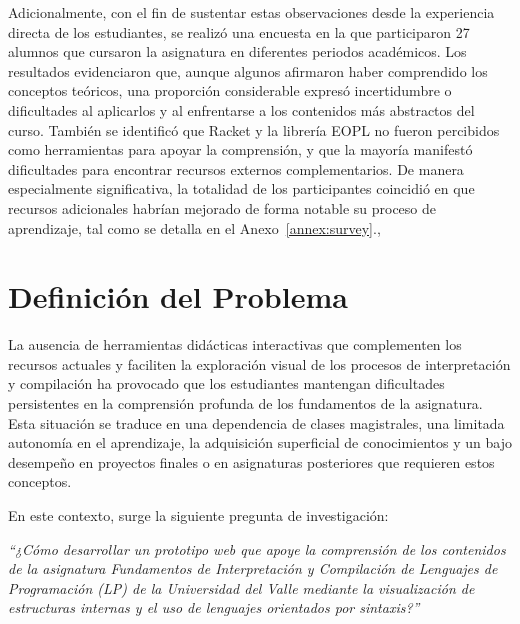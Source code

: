 Adicionalmente, con el fin de sustentar estas observaciones desde la experiencia directa de los estudiantes, se realizó una encuesta en la que participaron 27 alumnos que cursaron la asignatura en diferentes periodos académicos. Los resultados evidenciaron que, aunque algunos afirmaron haber comprendido los conceptos teóricos, una proporción considerable expresó incertidumbre o dificultades al aplicarlos y al enfrentarse a los contenidos más abstractos del curso. También se identificó que Racket y la librería EOPL no fueron percibidos como herramientas para apoyar la comprensión, y que la mayoría manifestó dificultades para encontrar recursos externos complementarios. De manera especialmente significativa, la totalidad de los participantes coincidió en que recursos adicionales habrían mejorado de forma notable su proceso de aprendizaje, tal como se detalla en el Anexo~\ref{annex:survey}.,

\section{Definición del Problema}

La ausencia de herramientas didácticas interactivas que complementen los recursos actuales y faciliten la exploración visual de los procesos de interpretación y compilación ha provocado que los estudiantes mantengan dificultades persistentes en la comprensión profunda de los fundamentos de la asignatura. Esta situación se traduce en una dependencia de clases magistrales, una limitada autonomía en el aprendizaje, la adquisición superficial de conocimientos y un bajo desempeño en proyectos finales o en asignaturas posteriores que requieren estos conceptos.

En este contexto, surge la siguiente pregunta de investigación:

\textit{“¿Cómo desarrollar un prototipo web que apoye la comprensión de los contenidos de la asignatura \textit{Fundamentos de Interpretación y Compilación de Lenguajes de Programación (LP)} de la Universidad del Valle mediante la visualización de estructuras internas y el uso de lenguajes orientados por sintaxis?”}
